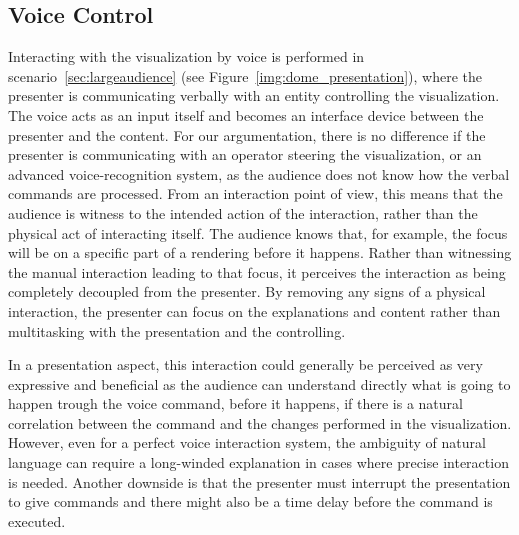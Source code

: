 \documentclass[journal]{vgtc}                %
\begin{document}
\subsection{Voice Control}

Interacting with the visualization by voice is performed in scenario~\ref{sec:largeaudience} (see Figure~\ref{img:dome_presentation}), where the presenter is communicating verbally with an entity controlling the visualization.
The voice acts as an input itself and becomes an interface device between the presenter and the content.
For our argumentation, there is no difference if the presenter is communicating with an operator steering the visualization, or an advanced voice-recognition system, as the audience does not know how the verbal commands are processed.
%
From an interaction point of view, this means that the audience is witness to the intended action of the interaction, rather than the physical act of interacting itself.
The audience knows that, for example, the focus will be on a specific part of a rendering before it happens.
Rather than witnessing the manual interaction leading to that focus, it perceives the interaction as being completely decoupled from the presenter.
By removing any signs of a physical interaction, the presenter can focus on the explanations and content rather than multitasking with the presentation and the controlling.

In a presentation aspect, this interaction could generally be perceived as very expressive and beneficial as the audience can understand directly what is going to happen trough the voice command, before it happens, if there is a natural correlation between the command and the changes performed in the visualization.
However, even for a perfect voice interaction system, the ambiguity of natural language can require a long-winded explanation in cases where precise interaction is needed. Another downside is that the presenter must interrupt the presentation to give commands and there might also be a time delay before the command is executed.
\end{document}
